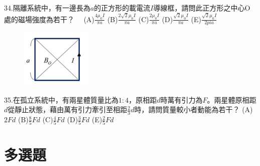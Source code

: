 \documentclass[cn,10pt,math=newtx]{elegantbook}
\begin{document}
\begin{example}
   34.隔離系統中，有一邊長為$a$的正方形的載電流$I$導線框，請問此正方形之中心O處的磁場強度為若干？　
   (A)$\frac{4\mu_0 I}{\pi a}$ (B)$\frac{2\sqrt{2} \mu_0 I}{\pi a}$ (C)$\frac{2\mu_0 I}{\pi a}$ (D)$\frac{\sqrt{2}\mu_0 I}{\pi a}$
    (E)$\frac{\sqrt{2}\mu_0 I}{2pi a}$
   \\
    \rightline{[成德高中教甄109]}
\end{example}
\begin{solution}
    
\end{solution}
\begin{figure}[htbp]
    \flushright
    \includegraphics[width=0.3\textwidth]{image/109成德34.png}
  \end{figure}
\newpage


\begin{example}
   35.在孤立系統中，有兩星體質量比為$1:4$，原相距$d$時萬有引力為$F$。兩星體原相距$d$從靜止狀態，藉由萬有引力牽引至相距$\frac{2}{3}d$時，請問質量較小者動能為若干？
   (A)$2Fd$ (B)$\frac{8}{5}Fd$ (C)$\frac{4}{5}Fd$ (D)$\frac{3}{5}Fd$ (E)$\frac{2}{5}Fd$
   \\
    \rightline{[成德高中教甄109]}
\end{example}
\begin{solution}
    
\end{solution}

\newpage

\section{多選題}
\end{document}
